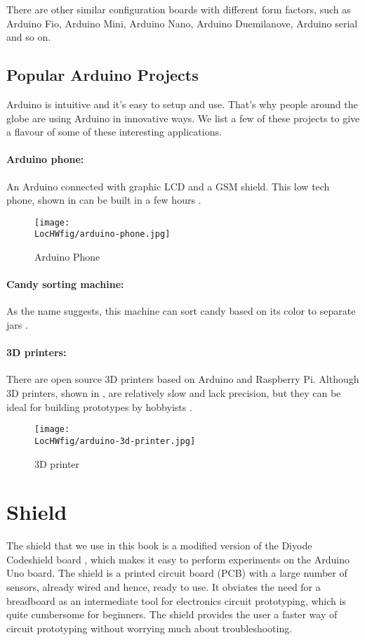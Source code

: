 There are other similar configuration boards with different form
factors, such as Arduino Fio, Arduino Mini, Arduino Nano, Arduino
Duemilanove, Arduino serial and so on.

\subsection{Popular Arduino Projects}
Arduino is intuitive and it's easy to setup and use. That's why people around the globe 
are using Arduino in innovative ways. We list a few of these projects to give a 
flavour of some of these interesting applications.

\paragraph{Arduino phone:} An Arduino connected with graphic LCD and a
GSM shield. This low tech phone, shown in  can
be built in a few hours \cite{phone-ref}.  
\begin{figure}
  \centering
  \texttt{[image: \\LocHWfig/arduino-phone.jpg]}
  \caption{Arduino Phone}
  \label{arduino-phone}
\end{figure}

\paragraph{Candy sorting machine:} As the name suggests, this machine 
can sort candy based on its color to separate jars \cite{candy-ref}.

\paragraph{3D printers:} There are open source 3D printers based on
Arduino and  Raspberry Pi. Although 3D printers, shown in ,
 are relatively slow and lack precision, but they can be ideal for building prototypes by
hobbyists \cite{3d-printer-ref}.
\begin{figure}
  \centering
  \texttt{[image: \\LocHWfig/arduino-3d-printer.jpg]}
  \caption{3D printer}
  \label{3dprinter}
\end{figure}

\section{Shield}
The shield that we use in this book is a modified version of the Diyode Codeshield 
board \cite{shield-ref}, which makes it easy to perform
experiments on the Arduino Uno board.  The shield is a printed circuit
board (PCB) with a large number of sensors, already wired and hence,
ready to use.  It obviates the need for a breadboard as an
intermediate tool for electronics circuit prototyping, which is quite
cumbersome for beginners.  The shield provides the user a faster way
of circuit prototyping without worrying much about troubleshooting.

